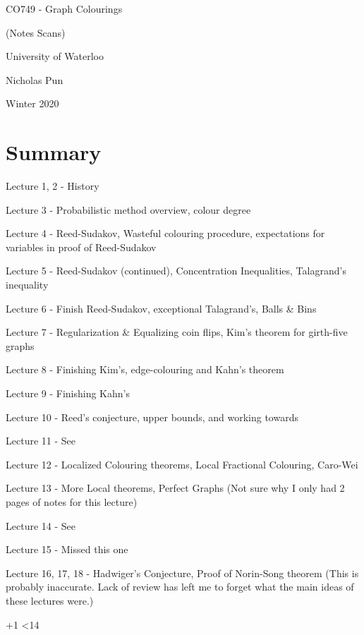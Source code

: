 \documentclass[12pt]{article}
\newcommand{\includelecture}[1]{
  
  
  \clearpage
}
\begin{document}
\begin{titlepage}
  \centering
  \vspace*{2in}
  {\huge CO749 - Graph Colourings}\par
  {\Large (Notes Scans)}\par
  \vspace{0.3in}
  {\large University of Waterloo}\par
  {\large Nicholas Pun}\par
  {\large Winter 2020}\par 
\end{titlepage}
 
\tableofcontents
\clearpage

\section*{Summary}
Lecture 1, 2 - History

Lecture 3 - Probabilistic method overview, colour degree

Lecture 4 - Reed-Sudakov, Wasteful colouring procedure, expectations for variables in proof of Reed-Sudakov

Lecture 5 - Reed-Sudakov (continued), Concentration Inequalities, Talagrand's inequality

Lecture 6 - Finish Reed-Sudakov, exceptional Talagrand's, Balls \& Bins

Lecture 7 - Regularization \& Equalizing coin flips, Kim's theorem for girth-five graphs

Lecture 8 - Finishing Kim's, edge-colouring and Kahn's theorem

Lecture 9 - Finishing Kahn's

Lecture 10 - Reed's conjecture, upper bounds, and working towards \cite{1911.02672} 

Lecture 11 - See \cite{1810.06704,1803.01051}

Lecture 12 - Localized Colouring theorems, Local Fractional Colouring, Caro-Wei

Lecture 13 - More Local theorems, Perfect Graphs (Not sure why I only had 2 pages of notes for this lecture)

Lecture 14 - See \cite{1811.11806}

Lecture 15 - Missed this one

Lecture 16, 17, 18 - Hadwiger's Conjecture, Proof of Norin-Song theorem
(This is probably inaccurate.
Lack of review has left me to forget what the main ideas of these lectures were.) 

\clearpage

\newcount\lecNum
{}
\loop
  \includelecture{sections/lec\the\lecNum.pdf}
  \advance \lecNum +1
\ifnum \lecNum<14
\repeat




\nocite{*}


\end{document}
